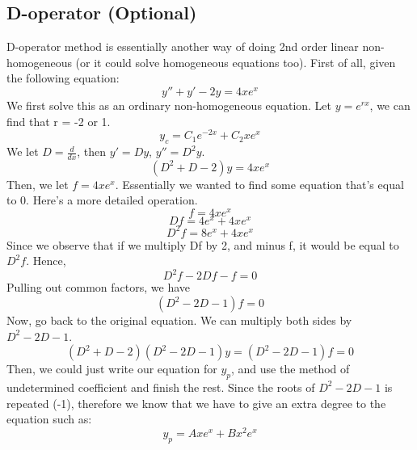 \documentclass{article}
\begin{document}
\subsection{D-operator (Optional)}
D-operator method is essentially another way of doing 2nd order linear non-homogeneous (or it could solve homogeneous equations too). First of all, given the following equation:
\begin{equation*}
	y''+y'-2y = 4xe^x
\end{equation*}
We first solve this as an ordinary non-homogeneous equation. Let $y = e^{rx}$,
we can find that r = -2 or 1.
\begin{equation*}
y_c = C_1e^{-2x} + C_2xe^x
\end{equation*}
We let $D = \frac{d}{dx}$, then $y' = Dy$, $y'' = D^2y$.
\begin{equation*}
	(D^2+D-2)y = 4xe^x
\end{equation*}
Then, we let $f = 4xe^x$. Essentially we wanted to find some equation that's equal to 0. Here's a more detailed operation.
\begin{equation*}
	f = 4xe^x
\end{equation*}
\begin{equation*}
	Df = 4e^x + 4xe^x
\end{equation*}
\begin{equation*}
	D^2f = 8e^x + 4xe^x
\end{equation*}
Since we observe that if we multiply Df by 2, and minus f, it would be equal to $D^2f$. Hence,
\begin{equation*}
	D^2f - 2Df - f = 0
\end{equation*}
Pulling out common factors, we have
\begin{equation*}
	(D^2-2D-1)f = 0
\end{equation*}
Now, go back to the original equation. We can multiply both sides by $D^2-2D-1$.
\begin{equation*}
	(D^2+D-2)(D^2-2D-1)y = (D^2-2D-1)f = 0
\end{equation*}
Then, we could just write our equation for $y_p$, and use the method of undetermined coefficient and finish the rest.
Since the roots of $D^2-2D-1$ is repeated (-1), therefore we know that we have to give an extra degree to the equation such as:
\begin{equation*}
	y_p = Axe^x + Bx^2e^x
\end{equation*}
\end{document}
